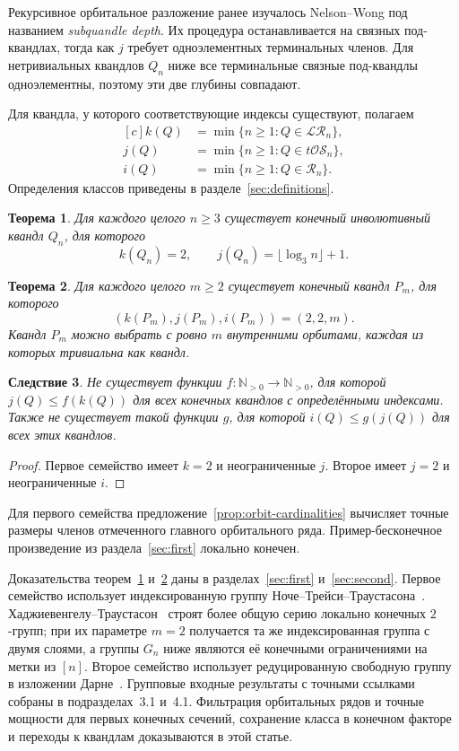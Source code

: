 \documentclass[11pt,a4paper]{article}
\newtheorem{theorem}{Теорема}[section]
\newtheorem{corollary}[theorem]{Следствие}
\theoremstyle{definition}
\theoremstyle{remark}
\newcommand{\R}{\mathcal R}
\newcommand{\LR}{\mathcal{LR}}
\newcommand{\tOS}{t\mathcal{OS}}
\begin{document}
Рекурсивное орбитальное разложение ранее изучалось Nelson--Wong
\cite[раздел~5]{NW} под названием \emph{subquandle depth}.
Их процедура останавливается на связных под-квандлах, тогда как \(j\)
требует одноэлементных терминальных членов. Для нетривиальных квандлов
\(Q_n\) ниже все терминальные связные под-квандлы одноэлементны,
поэтому эти две глубины совпадают.

Для квандла, у которого соответствующие индексы существуют,
полагаем
\[
 \begin{aligned}[c]
 k(Q)&=\min\{n\ge1:Q\in\LR_n\},\\
 j(Q)&=\min\{n\ge1:Q\in\tOS_n\},\\
 i(Q)&=\min\{n\ge1:Q\in\R_n\}.
 \end{aligned}
\]
Определения классов приведены в разделе~\ref{sec:definitions}.

\begin{theorem}\label{thm:first}
Для каждого целого \(n\ge3\) существует конечный инволютивный квандл \(Q_n\),
для которого
\[
 k(Q_n)=2,\qquad j(Q_n)=\lfloor\log_3n\rfloor+1.
\]
\end{theorem}

\begin{theorem}\label{thm:second}
Для каждого целого \(m\ge2\) существует конечный квандл \(P_m\),
для которого
\[
 (k(P_m),j(P_m),i(P_m))=(2,2,m).
\]
Квандл \(P_m\) можно выбрать с ровно \(m\) внутренними орбитами,
каждая из которых тривиальна как квандл.
\end{theorem}

\begin{corollary}\label{cor:nobounds}
Не существует функции \(f:\mathbb N_{>0}\to\mathbb N_{>0}\),
для которой \(j(Q)\le f(k(Q))\) для всех конечных квандлов
с определёнными индексами. Также не существует такой функции \(g\),
для которой \(i(Q)\le g(j(Q))\) для всех этих квандлов.
\end{corollary}
\begin{proof}
Первое семейство имеет \(k=2\) и неограниченные \(j\).
Второе имеет \(j=2\) и неограниченные \(i\).
\end{proof}

Для первого семейства предложение~\ref{prop:orbit-cardinalities}
вычисляет точные размеры членов отмеченного главного орбитального
ряда. Пример-бесконечное произведение из раздела~\ref{sec:first}
локально конечен.

Доказательства теорем~\ref{thm:first} и~\ref{thm:second}
даны в разделах~\ref{sec:first} и~\ref{sec:second}.
Первое семейство использует индексированную группу
Ноче--Трейси--Траустасона~\cite{NTT}. Хаджиевенгелу--Траустасон~\cite{HT}
строят более общую серию локально конечных \(2\)-групп; при их параметре
\(m=2\) получается та же индексированная группа с двумя слоями, а группы
\(G_n\) ниже являются её конечными ограничениями на метки из \([n]\).
Второе семейство использует редуцированную свободную группу в изложении
Дарне~\cite{Darne}. Групповые входные результаты с точными ссылками собраны
в подразделах~3.1 и~4.1. Фильтрация орбитальных рядов и точные мощности
для первых конечных сечений, сохранение класса в конечном факторе и
переходы к квандлам доказываются в этой статье.
\end{document}
